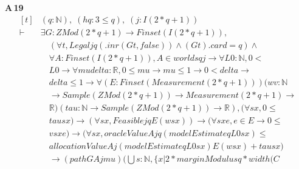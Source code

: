 \noindent\textbf{A\,19}\quad{}
{\footnotesize\[ \begin{aligned}[t]
&(\mathit{q} : \mathbb{N} ),\; (\mathit{hq} : 3 \leq \mathit{q}),\; (\mathit{j} : \mathit{I} (2*\mathit{q}+1))\\
\vdash\;&\exists \mathit{G} : \mathit{ZMod} (2*\mathit{q}+1) \to \mathit{Finset} (\mathit{I} (2*\mathit{q}+1)),\\
&\quad (\forall \mathit{t},\mathit{Legal} \mathit{j} \mathit{q} (.\mathit{inr} (\mathit{G} \mathit{t},\mathit{false})) \wedge (\mathit{G} \mathit{t}).\mathit{card}=\mathit{q}) \wedge\\
&\quad \forall \mathit{A} : \mathit{Finset} (\mathit{I} (2*\mathit{q}+1)), \mathit{A} \in \mathit{worlds} \mathit{q} \mathit{j} \to \forall \mathit{L0} : \mathbb{N} ,0 <\\
&\quad \mathit{L0} \to \forall \mathit{mu} \mathit{delta} : \mathbb{R} ,0 \leq \mathit{mu} \to \mathit{mu} \leq 1 \to 0 < \mathit{delta} \to\\
&\quad \mathit{delta} \leq 1 \to \forall (\mathit{E} : \mathit{Finset} (\mathit{Measurement} (2*\mathit{q}+1))) (\mathit{w} \mathit{v} : \mathbb{N}\\
&\quad \to \mathit{Sample} (\mathit{ZMod} (2*\mathit{q}+1)) \to \mathit{Measurement} (2*\mathit{q}+1) \to\\
&\quad \mathbb{R} ) (\mathit{tau} : \mathbb{N} \to \mathit{Sample} (\mathit{ZMod} (2*\mathit{q}+1)) \to \mathbb{R} ), (\forall \mathit{s} \mathit{x},0 \leq\\
&\quad \mathit{tau} \mathit{s} \mathit{x}) \to (\forall \mathit{s} \mathit{x},\mathit{Feasible} \mathit{j} \mathit{q} \mathit{E} (\mathit{w} \mathit{s} \mathit{x})) \to (\forall \mathit{s} \mathit{x} \mathit{e},\mathit{e} \in \mathit{E} \to 0 \leq\\
&\quad \mathit{v} \mathit{s} \mathit{x} \mathit{e}) \to (\forall \mathit{s} \mathit{x},\mathit{oracleValue} \mathit{A} \mathit{j} \mathit{q} (\mathit{modelEstimate} \mathit{q} \mathit{L0} \mathit{s} \mathit{x}) \leq\\
&\quad \mathit{allocationValue} \mathit{A} \mathit{j} (\mathit{modelEstimate} \mathit{q} \mathit{L0} \mathit{s} \mathit{x}) \mathit{E} (\mathit{w} \mathit{s} \mathit{x})+\mathit{tau} \mathit{s} \mathit{x})\\
&\quad \to (\mathit{path} \mathit{G} \mathit{A} \mathit{j} \mathit{mu}) (⋃ \mathit{s} : \mathbb{N} ,\{ \mathit{x} | 2*\mathit{marginModulus} \mathit{q}*\mathit{width} (\mathit{C}
\end{aligned} \]}

